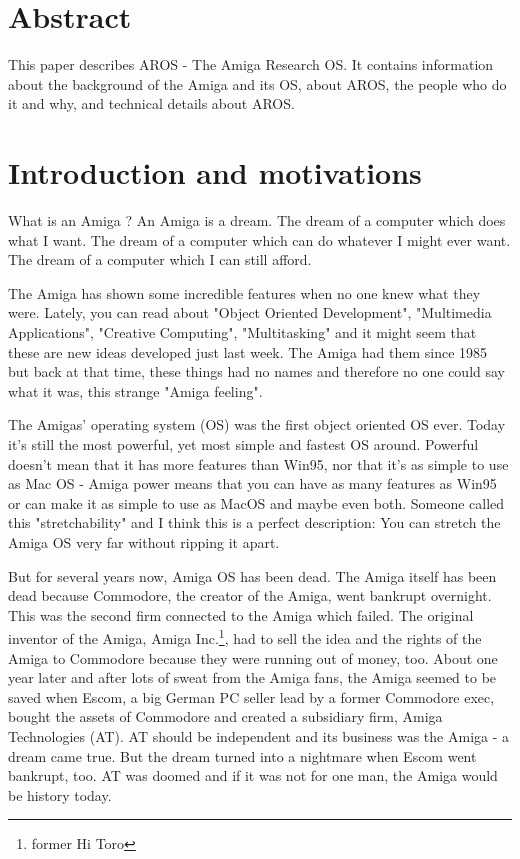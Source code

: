 \setlength{\parskip}{10pt}
\addtolength{\textheight}{2cm}
\addtolength{\textwidth}{2cm}
\addtolength{\hoffset}{-1cm}
\addtolength{\voffset}{-1cm}



\part{Abstract}

This paper describes AROS - The Amiga Research OS. It contains
information about the background of the Amiga and its OS, about AROS, the
people who do it and why, and technical details about AROS.

\part{Introduction and motivations}

What is an Amiga ? An Amiga is a dream. The dream of a computer which
does what I want. The dream of a computer which can do whatever I might
ever want. The dream of a computer which I can still afford.

The Amiga has shown some incredible features when no one knew what they
were. Lately, you can read about "Object Oriented Development", "Multimedia
Applications", "Creative Computing", "Multitasking" and it might seem that
these are new ideas developed just last week. The Amiga had them since 1985
but back at that time, these things had no names and therefore no one could
say what it was, this strange "Amiga feeling".

The Amigas' operating system (OS) was the first object oriented OS ever.
Today it's still the most powerful, yet most simple and fastest OS around.
Powerful doesn't mean that it has more features than Win95, nor that it's
as simple to use as Mac OS - Amiga power means that you can have as many
features as Win95 or can make it as simple to use as MacOS and maybe even
both. Someone called this "stretchability" and I think this is a perfect
description: You can stretch the Amiga OS very far without ripping it apart.

But for several years now, Amiga OS has been dead. The Amiga itself has
been dead because Commodore, the creator of the Amiga, went bankrupt
overnight. This was the second firm connected to the Amiga which failed.
The original inventor of the Amiga, Amiga Inc.\footnote{former Hi Toro},
had to sell the idea and the rights of the Amiga to Commodore because they
were running out of money, too. About one year later and after lots of
sweat from the Amiga fans, the Amiga seemed to be saved when Escom, a big
German PC seller lead by a former Commodore exec, bought the assets of
Commodore and created a subsidiary firm, Amiga Technologies (AT). AT should
be independent and its business was the Amiga - a dream came true. But the
dream turned into a nightmare when Escom went bankrupt, too. AT was doomed
and if it was not for one man, the Amiga would be history today.

